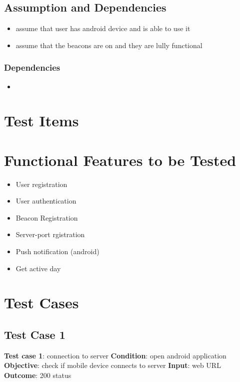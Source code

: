 \documentclass[11pt]{article}
\begin{document}
\subsection{Assumption and Dependencies}
\begin{itemize}
	\item assume that user has android device and is able to use it
	\item assume that the beacons are on and they are lully functional
\end{itemize}

\subsubsection{Dependencies}
\begin{itemize}
	\item	
\end{itemize}

\section{Test Items}
\section{Functional Features to be Tested}
\begin{itemize}
	\item User registration
	\item User authentication
	\item Beacon Registration
	\item Server-port rgistration
	\item Push notification (android)
	\item Get active day
\end{itemize}

\section{Test Cases}
\subsection{Test Case 1}
\textbf{Test case 1}: connection to server \newline
\textbf{Condition}: open android application \newline
\textbf{Objective}: check if mobile device connects to server  \newline
\textbf{Input}: web URL \newline
\textbf{Outcome}:  200 status \newline
\end{document}
